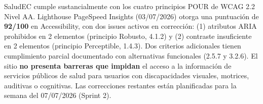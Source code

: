 \documentclass[12pt, a4paper]{article}
\begin{document}
\begin{okbox}
SaludEC cumple sustancialmente con los cuatro principios POUR de WCAG 2.2 Nivel AA. Lighthouse PageSpeed Insights (03/07/2026) otorga una puntuación de \textbf{92/100} en Accessibility, con dos issues activos en corrección: (1) atributos ARIA prohibidos en 2 elementos (principio Robusto, 4.1.2) y (2) contraste insuficiente en 2 elementos (principio Perceptible, 1.4.3). Dos criterios adicionales tienen cumplimiento parcial documentado con alternativas funcionales (2.5.7 y 3.2.6). El sitio \textbf{no presenta barreras que impidan} el acceso a la información de servicios públicos de salud para usuarios con discapacidades visuales, motrices, auditivas o cognitivas. Las correcciones restantes están planificadas para la semana del 07/07/2026 (Sprint 2).
\end{okbox}
\end{document}
